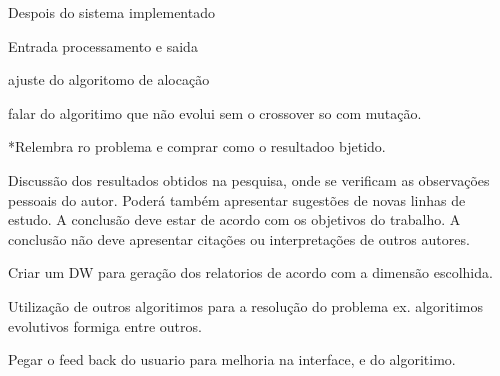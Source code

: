 	Despois do sistema implementado		

	Entrada processamento e saida

	ajuste do algoritomo de alocação


	falar do algoritimo que não evolui sem o crossover so com mutação.


\iniciocapitulo

*Relembra ro problema e comprar como o resultadoo bjetido.

Discussão dos resultados obtidos na pesquisa, onde se verificam as observações pessoais do autor. Poderá também apresentar sugestões de novas linhas de estudo. A conclusão deve estar de acordo com os objetivos do trabalho. A conclusão não deve apresentar citações ou interpretações de outros autores.


Criar um DW para geração dos relatorios de acordo com a dimensão escolhida.

Utilização de outros algoritimos para a resolução do problema ex. algoritimos evolutivos formiga entre outros.

Pegar o feed back do usuario para melhoria na interface, e do algoritimo.